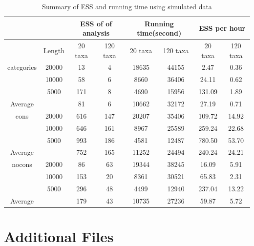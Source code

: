 \documentclass{bmcart}
\begin{document}
\begin{backmatter}
\begin{table}[h!]
  \centering
\begin{tabular}{cc|cc|cc|cc}
\hline
&&\multicolumn{2}{c|}{ESS of of analysis}&\multicolumn{2}{c|}{Running time(second)}&\multicolumn{2}{c}{ESS per hour}\\
\hline
&Length&20 taxa&120 taxa&20 taxa&120 taxa&20 taxa&120 taxa\\
categories&20000&13&4&18635&44155&2.47&0.36\\
&10000&58&6&8660&36406&24.11&0.62\\
&5000&171&8&4690&15956&131.09&1.89\\
Average&&81&6&10662&32172&27.19&0.71\\
\hline
cons&20000&616&147&20207&35406&109.72&14.92\\
&10000&646&161&8967&25589&259.24&22.68\\
&5000&993&186&4581&12487&780.50&53.70\\
Average&&752&165&11252&24494&240.24&24.21\\
\hline
nocons&20000&86&63&19344&38245&16.09&5.91\\
&10000&153&20&8361&30521&65.83&2.31\\
&5000&296&48&4499&12940&237.04&13.22\\
Average&&179&43&10735&27236&59.87&5.72\\
\hline
\end{tabular}
\caption{Summary of ESS and running time using simulated data}\label{eff_comp1}
\end{table}
\clearpage
\newpage
\section*{Additional Files}

\end{backmatter}
\end{document}
